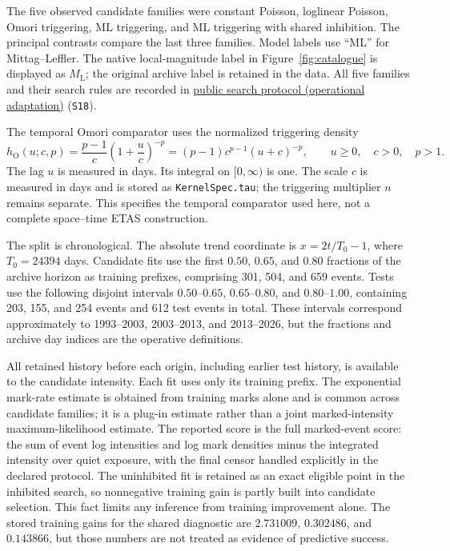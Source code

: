 The five observed candidate families were constant Poisson, loglinear Poisson, Omori triggering, ML triggering, and ML triggering with shared inhibition. The principal contrasts compare the last three families. Model labels use ``ML'' for Mittag--Leffler. The native local-magnitude label in Figure~\ref{fig:catalogue} is displayed as \(M_{\mathrm L}\); the original archive label is retained in the data. All five families and their search rules are recorded in \href{https://github.com/Drefetr/InhibitoryEarthquakeModels/blob/3e76a174cf4f58ce601c6c9640c4d0c11168813f/engine/iteration_27/configs/observed_frozen.json}{public search protocol (operational adaptation)} (\texttt{S18}).

The temporal Omori comparator uses the normalized triggering density
\[
 h_{\mathrm O}(u;c,p)=\frac{p-1}{c}\left(1+\frac{u}{c}\right)^{-p}
 =(p-1)c^{p-1}(u+c)^{-p},
 \qquad u\geq0,\quad c>0,\quad p>1.
\]
The lag \(u\) is measured in days. Its integral on $[0,\infty)$ is one. The scale $c$ is measured in days and
is stored as \texttt{KernelSpec.tau}; the triggering multiplier $n$ remains
separate. This specifies the temporal comparator used here, not a complete
space--time ETAS construction.

The split is chronological. The absolute trend coordinate is \(x=2t/T_0-1\), where \(T_0=24394\) days. Candidate fits use the first \(0.50\), \(0.65\), and \(0.80\) fractions of the archive horizon as training prefixes, comprising 301, 504, and 659 events. Tests use the following disjoint intervals \(0.50\)--\(0.65\), \(0.65\)--\(0.80\), and \(0.80\)--\(1.00\), containing 203, 155, and 254 events and 612 test events in total. These intervals correspond approximately to 1993--2003, 2003--2013, and 2013--2026, but the fractions and archive day indices are the operative definitions.

All retained history before each origin, including earlier test history, is available to the candidate intensity. Each fit uses only its training prefix. The exponential mark-rate estimate is obtained from training marks alone and is common across candidate families; it is a plug-in estimate rather than a joint marked-intensity maximum-likelihood estimate. The reported score is the full marked-event score: the sum of event log intensities and log mark densities minus the integrated intensity over quiet exposure, with the final censor handled explicitly in the declared protocol. The uninhibited fit is retained as an exact eligible point in the inhibited search, so nonnegative training gain is partly built into candidate selection. This fact limits any inference from training improvement alone. The stored training gains for the shared diagnostic are \(2.731009\), \(0.302486\), and \(0.143866\), but those numbers are not treated as evidence of predictive success.

